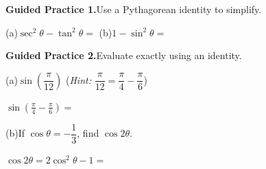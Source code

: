 \documentclass[10pt]{article}
\begin{document}
\begin{practicebox}

\textbf{Guided Practice 1.}\quad Use a Pythagorean identity to simplify.

\vspace{4pt}
(a)\quad $\sec^2\theta - \tan^2\theta = $ \underline{\hspace{2.8cm}}
\hspace{1cm}
(b)\quad $1 - \sin^2\theta = $ \underline{\hspace{2.8cm}}

\vspace{0.10in}
\textbf{Guided Practice 2.}\quad Evaluate exactly using an identity.

\vspace{4pt}
(a)\quad $\sin\!\left(\dfrac{\pi}{12}\right)$
\quad(\textit{Hint:} $\dfrac{\pi}{12} = \dfrac{\pi}{4} - \dfrac{\pi}{6}$)

\vspace{4pt}
$\sin\!\left(\tfrac{\pi}{4} - \tfrac{\pi}{6}\right) = $ \underline{\hspace{8cm}}

\vspace{8pt}
(b)\quad If $\cos\theta = -\dfrac{1}{3}$, find $\cos 2\theta$.

\vspace{4pt}
$\cos 2\theta = 2\cos^2\theta - 1 = $ \underline{\hspace{5cm}}

\end{practicebox}
\end{document}
